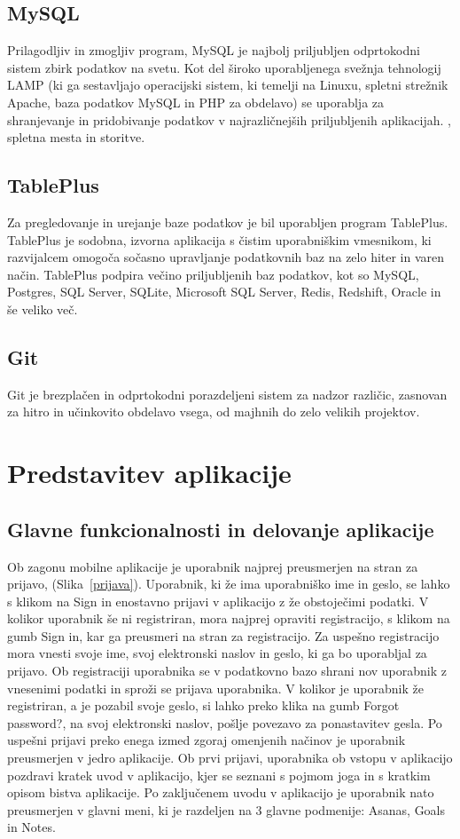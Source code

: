 \documentclass[a4paper, 12pt]{book}
\begin{document}
\section{MySQL}
Prilagodljiv in zmogljiv program, MySQL je najbolj priljubljen odprtokodni sistem zbirk podatkov na svetu. Kot del široko uporabljenega svežnja tehnologij LAMP (ki ga sestavljajo operacijski sistem, ki temelji na Linuxu, spletni strežnik Apache, baza podatkov MySQL in PHP za obdelavo) se uporablja za shranjevanje in pridobivanje podatkov v najrazličnejših priljubljenih aplikacijah. , spletna mesta in storitve.~\cite{MySQL}

\section{TablePlus}
Za pregledovanje in urejanje baze podatkov je bil uporabljen program TablePlus. TablePlus je sodobna, izvorna aplikacija s čistim uporabniškim vmesnikom, ki razvijalcem omogoča sočasno upravljanje podatkovnih baz na zelo hiter in varen način. TablePlus podpira večino priljubljenih baz podatkov, kot so MySQL, Postgres, SQL Server, SQLite, Microsoft SQL Server, Redis, Redshift, Oracle in še veliko več.~\cite{TablePlus}

\section{Git}
Git je brezplačen in odprtokodni porazdeljeni sistem za nadzor različic, zasnovan za hitro in učinkovito obdelavo vsega, od majhnih do zelo velikih projektov.~\cite{Git}


\chapter{Predstavitev aplikacije}
\label{ch3}
\section{Glavne funkcionalnosti in delovanje aplikacije}
Ob zagonu mobilne aplikacije je uporabnik najprej preusmerjen na stran za prijavo, (Slika~\ref{prijava}). Uporabnik, ki že ima uporabniško ime in geslo, se lahko s klikom na Sign in enostavno prijavi v aplikacijo z že obstoječimi podatki. V kolikor uporabnik še ni registriran, mora najprej opraviti registracijo, s klikom na gumb Sign in, kar ga preusmeri na stran za registracijo. Za uspešno registracijo mora vnesti svoje ime, svoj elektronski naslov in geslo, ki ga bo uporabljal za prijavo. Ob registraciji uporabnika se v podatkovno bazo shrani nov uporabnik z vnesenimi podatki in sproži se prijava uporabnika. V kolikor je uporabnik že registriran, a je pozabil svoje geslo, si lahko preko klika na gumb Forgot password?, na svoj elektronski naslov, pošlje povezavo za ponastavitev gesla. Po uspešni prijavi preko enega izmed zgoraj omenjenih načinov je uporabnik preusmerjen v jedro aplikacije. Ob prvi prijavi, uporabnika ob vstopu v aplikacijo pozdravi kratek uvod v aplikacijo, kjer se seznani s pojmom joga in s kratkim opisom bistva aplikacije. Po zaključenem uvodu v aplikacijo je uporabnik nato preusmerjen v glavni meni, ki je razdeljen na 3 glavne podmenije: Asanas, Goals in Notes.\\
\end{document}
